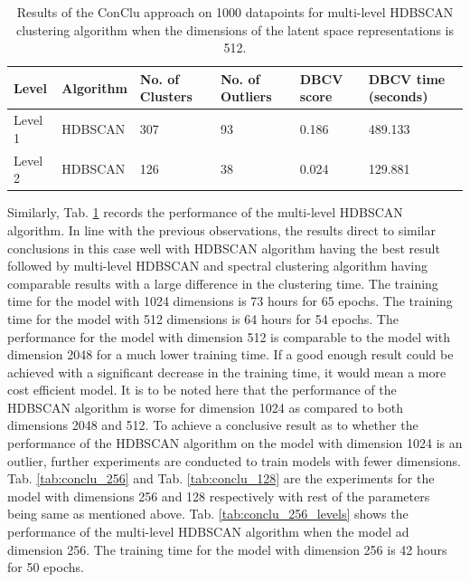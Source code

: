 \begin{table}[H]
  \setlength\extrarowheight{10pt}
  \caption{Results of the ConClu approach on 1000 datapoints for multi-level \ac{HDBSCAN} clustering algorithm when the dimensions of the latent space representations is 512. }
  \centering
  \begin{tabular}{|l|l|l|l|l|l|}
    \toprule
    Level & Algorithm	& No. of Clusters	& No. of Outliers	& DBCV score	& \ac{DBCV} time (seconds)	\\  
    \midrule
    Level 1 & \ac{HDBSCAN}	& 307 & 93 & 0.186	& 489.133  \\ \cline{1-6}
    Level 2 & \ac{HDBSCAN}	& 126	& 38	& 0.024	& 129.881  \\ 
    \bottomrule
  \end{tabular}
  \label{tab:conclu_512_levels}
\end{table}

Similarly, Tab. \ref{tab:conclu_512_levels} records the performance of the multi-level \ac{HDBSCAN} algorithm. In line with the previous observations, the results direct to similar conclusions in this case well with \ac{HDBSCAN} algorithm having the best result followed by multi-level \ac{HDBSCAN} and spectral clustering algorithm having comparable results with a large difference in the clustering time. The training time for the model with 1024 dimensions is 73 hours for 65 epochs. The training time for the model with 512 dimensions is 64 hours for 54 epochs. The performance for the model with dimension 512 is comparable to the model with dimension 2048 for a much lower training time. If a good enough result could be achieved with a significant decrease in the training time, it would mean a more cost efficient model. It is to be noted here that the performance of the \ac{HDBSCAN} algorithm is worse for dimension 1024 as compared to both dimensions 2048 and 512. To achieve a conclusive result as to whether the performance of the \ac{HDBSCAN} algorithm on the model with dimension 1024 is an outlier, further experiments are conducted to train models with fewer dimensions. Tab. \ref{tab:conclu_256} and Tab. \ref{tab:conclu_128} are the experiments for the model with dimensions 256 and 128 respectively with rest of the parameters being same as mentioned above. Tab. \ref{tab:conclu_256_levels} shows the performance of the multi-level \ac{HDBSCAN} algorithm when the model ad dimension 256. The training time for the model with dimension 256 is 42 hours for 50 epochs. 

